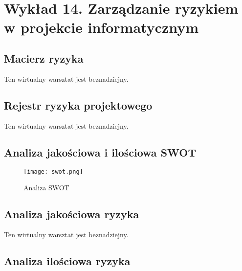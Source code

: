\chapter{Wykład 14. Zarządzanie ryzykiem w projekcie informatycznym}

\section{Macierz ryzyka}

Ten wirtualny warsztat jest beznadziejny.


\section{Rejestr ryzyka projektowego}

Ten wirtualny warsztat jest beznadziejny.


\section{Analiza jakościowa i ilościowa SWOT}

\begin{figure}[!h]
\begin{center}
\texttt{[image: swot.png]}
\caption[Analiza SWOT]{Analiza SWOT}
\label{rysunekProces}
\end{center}
\end{figure}

\clearpage


\section{Analiza jakościowa ryzyka}

Ten wirtualny warsztat jest beznadziejny.


\section{Analiza ilościowa ryzyka}


